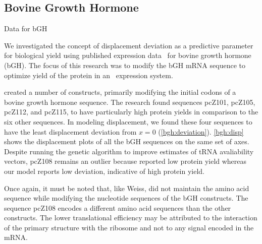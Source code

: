 \documentclass[12pt]{article}
\numberwithin{equation}{section}
\begin{document}
\subsection{Bovine Growth Hormone}
\label{section:bgh}

\begin{cfigure}
  \footnotesize
  \caption{Data for bGH}
\end{cfigure}

We investigated the concept of displacement deviation as a predictive parameter
for biological yield using published expression data~\cite{schoner:bgh} for bovine growth hormone (bGH).
The focus of this research was to modify the bGH mRNA sequence to optimize
yield of the protein in an \ecoli\ expression system.

\citet{schoner:bgh} created a number of constructs, primarily modifying the initial codons of a
bovine growth hormone sequence.  The research found sequences pcZ101,
pcZ105, pcZ112, and pcZ115, to have particularly high protein yields
in comparison to the six other sequences. In
modeling displacement, we found these four sequences  to have the least
displacement deviation from $x = 0$
(\autoref{bgh:deviation}). \autoref{bgh:disp} shows the displacement
plots of all the bGH sequences on the same set of axes. 
Despite running the genetic algorithm to improve estimates of tRNA avaliability vectors, pcZ108 remains an
outlier because \citeauthor{schoner:bgh} reported low protein
yield whereas our model reports low deviation, indicative of 
high protein yield.

Once again, it must be noted that, like Weiss, \citeauthor{schoner:bgh}
did not maintain the amino acid sequence while modifying the nucleotide sequences of the bGH constructs.
The sequence pcZ108 encodes a different amino acid sequences than the other constructs.
The lower translational efficiency may be attributed to the interaction
of the primary structure with the ribosome and not to any signal encoded
in the mRNA.
\end{document}
